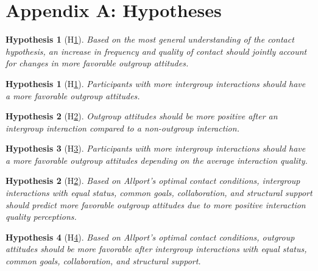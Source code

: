 \documentclass[man, 12pt, a4paper, mask]{apa7}
\theoremstyle{break}
\theoremstyle{plain}
\newtheorem{hyp}{Hypothesis}
\newtheorem{subhyp}{Hypothesis}
\begin{document}
\printbibliography

\appendix

\section{Appendix A: Hypotheses}
\label{app:AppendixHypotheses}

\begin{hyp}[H\ref{hyp:contact}] \label{hyp:contact}
Based on the most general understanding of the contact hypothesis, an increase in frequency and quality of contact should jointly account for changes in more favorable outgroup attitudes.
\end{hyp}

\begin{subhyp}[H\ref{hyp:contactFreq}] \label{hyp:contactFreq}
\addtolength{\leftskip}{2.5em}
Participants with more intergroup interactions should have a more favorable outgroup attitudes.
\end{subhyp}

\begin{subhyp}[H\ref{hyp:contactDummy}] \label{hyp:contactDummy}
\addtolength{\leftskip}{2.5em}
Outgroup attitudes should be more positive after an intergroup interaction compared to a non-outgroup interaction.
\end{subhyp}

\begin{subhyp}[H\ref{hyp:contactFreqQual}] \label{hyp:contactFreqQual}
\addtolength{\leftskip}{2.5em}
Participants with more intergroup interactions should have a more favorable outgroup attitudes depending on the average interaction quality.
\end{subhyp}

\begin{hyp}[H\ref{hyp:AllportsConditions}] \label{hyp:AllportsConditions}
Based on Allport's optimal contact conditions, intergroup interactions with equal status, common goals, collaboration, and structural support should predict more favorable outgroup attitudes due to more positive interaction quality perceptions.
\end{hyp}

\setcounter{subhyp}{0}
\begin{subhyp}[H\ref{hyp:AllportsPred}] \label{hyp:AllportsPred}
\addtolength{\leftskip}{2.5em}
Based on Allport's optimal contact conditions, outgroup attitudes should be more favorable after intergroup interactions with equal status, common goals, collaboration, and structural support.
\end{subhyp}
\end{document}
